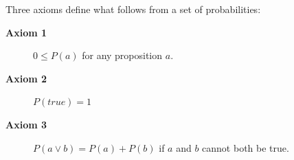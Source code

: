 \documentclass[12pt]{beamer} %
\begin{document}




\begin{slide}
Three axioms define what follows from
a set of probabilities:
\begin{description}
\item[\textbf{Axiom 1}] $0\leq P(a)$ for any proposition $a $. 
\item[\textbf{Axiom 2}] $P(true) = 1$ 
\item[\textbf{Axiom 3}] $P(a \vee b)=P(a)+P(b)$ if $a $ and $b$ cannot both be true.  
\end{description}
\end{slide}
\end{document}
